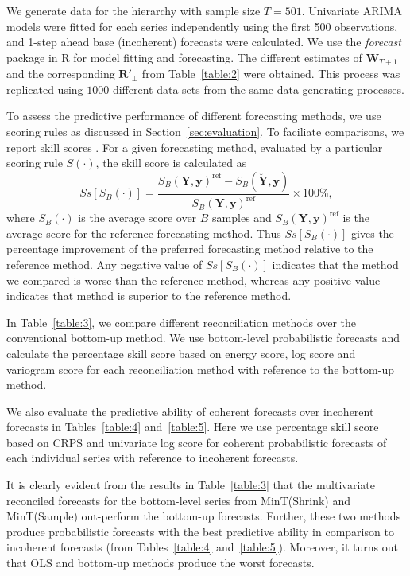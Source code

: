 \documentclass[a4paper, 11pt]{article}
\theoremstyle{theo}
\theoremstyle{definition}
\begin{document}
We generate data for the hierarchy with sample size $T=501$. Univariate ARIMA models were fitted for each series independently using the first 500 observations, and 1-step ahead base (incoherent) forecasts were calculated. We use the \textit{forecast} package \citep{hyndman2017forecasting} in R \citep{Rcore} for model fitting and forecasting. The different estimates of $\bm{W}_{T+1}$ and the corresponding $\bm{R}'_\bot$ from Table~\ref{table:2} were obtained. This process was replicated using $1000$ different data sets from the same data generating processes.

To assess the predictive performance of different forecasting methods, we use scoring rules as discussed in Section~\ref{sec:evaluation}. To faciliate comparisons, we report skill scores \citep{Gneiting2007}. For a given forecasting method, evaluated by a particular scoring rule $S(\cdot)$, the skill score is calculated as
\begin{equation}
Ss[S_B(\cdot)] = \frac{S_B(\bm{Y},\bm{y})^{\text{ref}} - S_B(\breve{\bm{Y}},\bm{y})}{S_B(\bm{Y},\bm{y})^{\text{ref}}}\times 100\%,
\end{equation}
where $S_B(\cdot)$ is the average score over $B$ samples and $S_B(\bm{Y},\bm{y})^{\text{ref}}$ is the average score for the reference forecasting method. Thus $Ss[S_B(\cdot)]$ gives the percentage improvement of the preferred forecasting method relative to the reference method. Any negative value of $Ss[S_B(\cdot)]$ indicates that the method we compared is worse than the reference method, whereas any positive value indicates that method is superior to the reference method.

In Table~\ref{table:3}, we compare different reconciliation methods over the conventional bottom-up method. We use bottom-level probabilistic forecasts and calculate the percentage skill score based on energy score, log score and variogram score for each reconciliation method with reference to the bottom-up method.

We also evaluate the predictive ability of coherent forecasts over incoherent forecasts in Tables~\ref{table:4} and~\ref{table:5}. Here we use percentage skill score based on CRPS and univariate log score for coherent probabilistic forecasts of each individual series with reference to incoherent forecasts.

It is clearly evident from the results in Table~\ref{table:3} that the multivariate reconciled forecasts for the bottom-level series from MinT(Shrink) and MinT(Sample) out-perform the bottom-up forecasts. Further, these two methods produce probabilistic forecasts with the best predictive ability in comparison to incoherent forecasts (from Tables~\ref{table:4} and~\ref{table:5}). Moreover, it turns out that OLS and bottom-up methods produce the worst forecasts.
\end{document}
